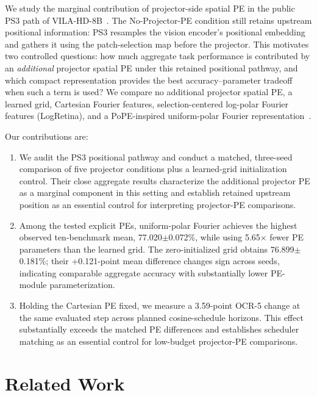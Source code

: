 \documentclass{article}
\begin{document}
We study the marginal contribution of projector-side spatial PE
in the public PS3 path of VILA-HD-8B~\cite{ps3}. The
No-Projector-PE condition still retains upstream positional
information: PS3 resamples the vision encoder's positional
embedding and gathers it using the patch-selection map before
the projector. This motivates two controlled questions: how much
aggregate task performance is contributed by an
\emph{additional} projector spatial PE under this retained
positional pathway, and which compact representation provides
the best accuracy--parameter tradeoff when such a term is used?
We compare no additional projector spatial PE, a learned grid,
Cartesian Fourier features, selection-centered log-polar Fourier
features (LogRetina), and a PoPE-inspired uniform-polar Fourier
representation~\cite{pope_pe}.

Our contributions are:
\begin{enumerate}
  \item We audit the PS3 positional pathway and conduct a matched,
    three-seed comparison of five projector conditions plus a
    learned-grid initialization control. Their close aggregate
    results characterize the additional projector PE as a
    marginal component in this setting and establish retained
    upstream position as an essential control for interpreting
    projector-PE comparisons.

  \item Among the tested explicit PEs, uniform-polar Fourier
    achieves the highest observed ten-benchmark mean,
    77.020$\pm$0.072\%, while using 5.65$\times$ fewer PE
    parameters than the learned grid. The zero-initialized grid
    obtains 76.899$\pm$0.181\%; their +0.121-point mean
    difference changes sign across seeds, indicating
    comparable aggregate accuracy with substantially lower
    PE-module parameterization.

  \item Holding the Cartesian PE fixed, we measure a 3.59-point
    OCR-5 change at the same evaluated step across planned
    cosine-schedule horizons. This effect substantially exceeds
    the matched PE differences and establishes scheduler matching
    as an essential control for low-budget projector-PE
    comparisons.
\end{enumerate}

\section{Related Work}
\end{document}
